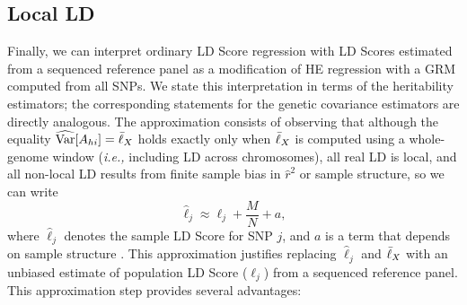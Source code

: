 \documentclass[11pt]{article}
\numberwithin{equation}{section}
\numberwithin{definition}{section}
\numberwithin{thm}{section}
\numberwithin{lemma}{section}
\numberwithin{prop}{section}
\numberwithin{cor}{section}
\numberwithin{hyp}{section}
\begin{document}
\subsection{Local LD}\label{The Local LD Approximation}

Finally, we can interpret ordinary LD Score regression with LD Scores estimated from a sequenced reference panel
as a modification of HE regression with a GRM computed from all SNPs. 
We state this interpretation in terms of the heritability estimators; the corresponding statements for the genetic covariance estimators
are directly analogous.
The approximation consists of observing that although the equality $\widehat{\mathrm{Var}}[A_{hi}]=\bar{\ell}_X$ holds exactly only when $\bar{\ell}_X$ is computed using a
whole-genome window (\emph{i.e.,} including LD across chromosomes), all real LD is local, and all non-local LD results from
finite sample bias in $\hat{r}^2$ or sample structure, so we can write
\begin{equation}\label{local ld eqn}
	\hat{\ell}_j \approx \ell_j + \dfrac{M}{N} + a,
\end{equation}
where $\hat{\ell}_j$ denotes the sample LD Score for SNP $j$, and $a$ is a term that depends on sample structure \cite{buliksullivan2014}.
This approximation justifies replacing $\hat{\ell}_j$ and $\bar{\ell}_X$ with an unbiased estimate of population LD Score 
($\ell_j$) from a sequenced reference panel. This approximation step provides several advantages:
\end{document}
